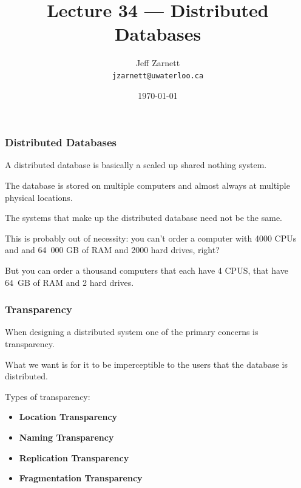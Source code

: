 

\title{Lecture  34 --- Distributed Databases}

\author{Jeff Zarnett \\ \small \texttt{jzarnett@uwaterloo.ca}}
\date{\today}




\begin{frame}
  \titlepage

 \end{frame}



\begin{frame}
\frametitle{Distributed Databases}

A distributed database is basically a scaled up shared nothing system. 

The database is stored on multiple computers and almost always at multiple physical locations.

 The systems that make up the distributed database need not be the same. 
 
This is probably out of necessity: you can't order a computer with 4000 CPUs and and 64~000 GB of RAM and 2000 hard drives, right? 
 
But you can order a thousand computers that each have 4 CPUS, that have 64~GB of RAM and 2 hard drives.

\end{frame}


\begin{frame}
\frametitle{Transparency}

When designing a distributed system one of the primary concerns is \alert{transparency}. 

What we want is for it to be imperceptible to the users that the database is distributed.

Types of transparency: 
\begin{itemize}
	\item \textbf{Location Transparency}
	\item \textbf{Naming Transparency}
	\item \textbf{Replication Transparency}
	\item \textbf{Fragmentation Transparency}
\end{itemize}



\end{frame}

